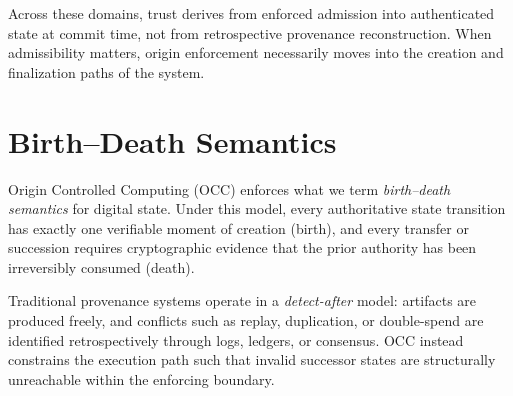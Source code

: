\documentclass[11pt,letterpaper]{article}
\theoremstyle{occplain}
\theoremstyle{occremark}
\begin{document}
Across these domains, trust derives from enforced admission into authenticated state at commit time, not from retrospective provenance reconstruction. When admissibility matters, origin enforcement necessarily moves into the creation and finalization paths of the system.


\section{Birth--Death Semantics}
\label{sec:birth-death}

Origin Controlled Computing (OCC) enforces what we term \emph{birth--death semantics} for digital state. Under this model, every authoritative state transition has exactly one verifiable moment of creation (birth), and every transfer or succession requires cryptographic evidence that the prior authority has been irreversibly consumed (death).

Traditional provenance systems operate in a \emph{detect-after} model: artifacts are produced freely, and conflicts such as replay, duplication, or double-spend are identified retrospectively through logs, ledgers, or consensus. OCC instead constrains the execution path such that invalid successor states are structurally unreachable within the enforcing boundary.
\end{document}
